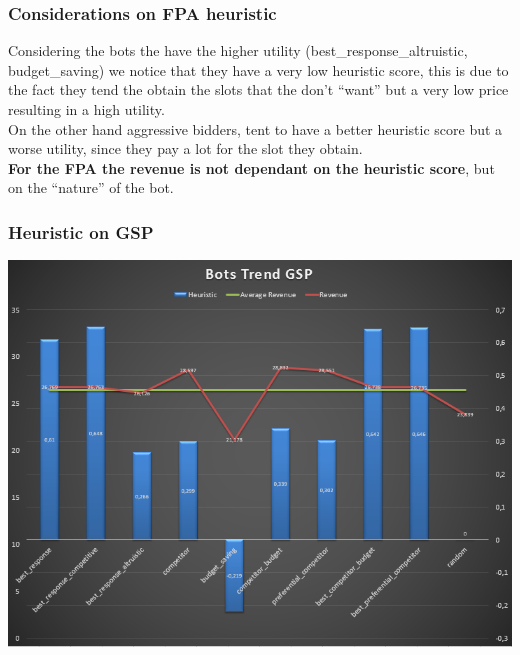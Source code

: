 \documentclass{beamer}
\begin{document}
\begin{frame}
\frametitle{Considerations on FPA heuristic}
Considering the bots the have the higher utility (best\_response\_altruistic, budget\_saving) we notice that they have a very \alert{low} heuristic score, this is due to the fact they tend the obtain the slots that the don't ``want'' but a very \alert{low price} resulting in a high utility.\\
\medskip
On the other hand aggressive bidders, tent to have a better heuristic score but a worse utility, since they pay a lot for the slot they obtain.\\
\medskip
\textbf{For the FPA the revenue is not dependant on the heuristic score}, but on the ``nature'' of the bot.
\end{frame}


\begin{frame}
\frametitle{Heuristic on GSP}
\begin{center}
\includegraphics[scale=0.46]{img/Auctions/GSP_all_Heuristic.PNG} 
\end{center}
\end{frame}
\end{document}
